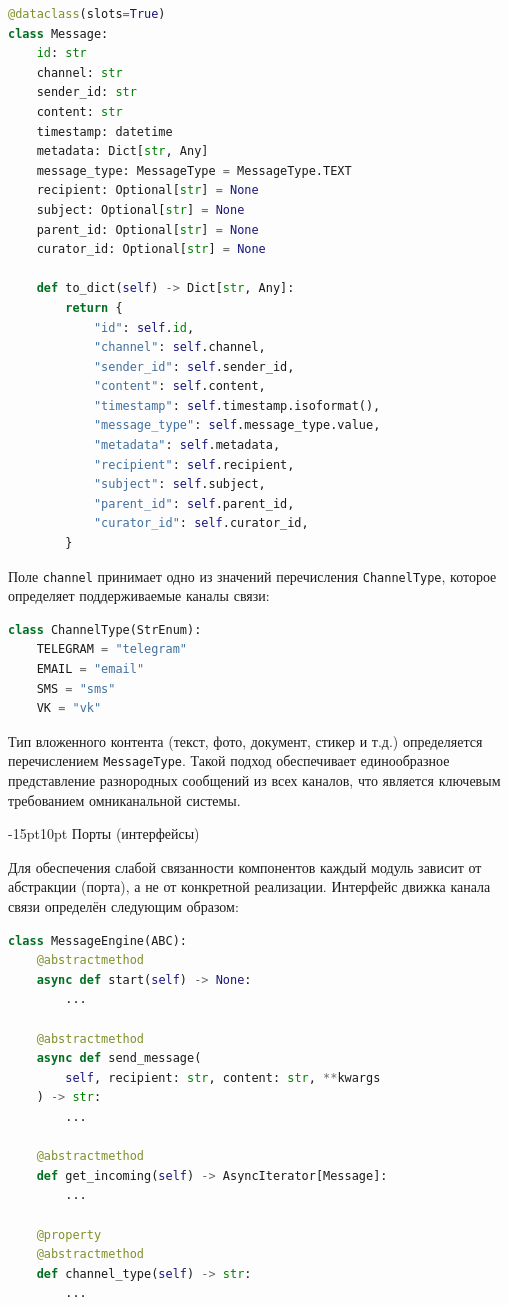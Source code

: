 \documentclass[12pt,a4paper]{report}
\makeatletter
\renewcommand{\section}{%
  \@startsection{section}{1}{\z@}%
  {-15pt}{10pt}%
  {\centering\normalfont\bfseries\large}}
\makeatother
\begin{document}
\begin{lstlisting}[language=Python]
@dataclass(slots=True)
class Message:
    id: str
    channel: str
    sender_id: str
    content: str
    timestamp: datetime
    metadata: Dict[str, Any]
    message_type: MessageType = MessageType.TEXT
    recipient: Optional[str] = None
    subject: Optional[str] = None
    parent_id: Optional[str] = None
    curator_id: Optional[str] = None

    def to_dict(self) -> Dict[str, Any]:
        return {
            "id": self.id,
            "channel": self.channel,
            "sender_id": self.sender_id,
            "content": self.content,
            "timestamp": self.timestamp.isoformat(),
            "message_type": self.message_type.value,
            "metadata": self.metadata,
            "recipient": self.recipient,
            "subject": self.subject,
            "parent_id": self.parent_id,
            "curator_id": self.curator_id,
        }
\end{lstlisting}

Поле \texttt{channel} принимает одно из значений перечисления \texttt{ChannelType}, которое определяет поддерживаемые каналы связи:

\begin{lstlisting}[language=Python]
class ChannelType(StrEnum):
    TELEGRAM = "telegram"
    EMAIL = "email"
    SMS = "sms"
    VK = "vk"
\end{lstlisting}

Тип вложенного контента (текст, фото, документ, стикер и т.д.) определяется перечислением \texttt{MessageType}. Такой подход обеспечивает единообразное представление разнородных сообщений из всех каналов, что является ключевым требованием омниканальной системы.

\section{Порты (интерфейсы)}

Для обеспечения слабой связанности компонентов каждый модуль зависит от абстракции (порта), а не от конкретной реализации. Интерфейс движка канала связи определён следующим образом:

\begin{lstlisting}[language=Python]
class MessageEngine(ABC):
    @abstractmethod
    async def start(self) -> None:
        ...

    @abstractmethod
    async def send_message(
        self, recipient: str, content: str, **kwargs
    ) -> str:
        ...

    @abstractmethod
    def get_incoming(self) -> AsyncIterator[Message]:
        ...

    @property
    @abstractmethod
    def channel_type(self) -> str:
        ...
\end{lstlisting}
\end{document}
